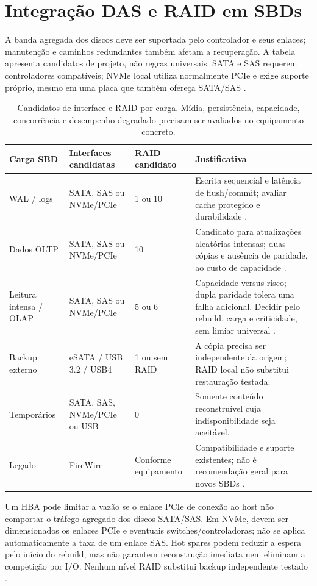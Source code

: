 \documentclass[titlepage]{article}
\begin{document}
\section{Integração DAS e RAID em SBDs}
\label{sec:das_raid_integracao}
A banda agregada dos discos deve ser suportada pelo controlador e seus enlaces; manutenção e caminhos redundantes também afetam a recuperação. A tabela apresenta candidatos de projeto, não regras universais. SATA e SAS requerem controladores compatíveis; NVMe local utiliza normalmente PCIe e exige suporte próprio, mesmo em uma placa que também ofereça SATA/SAS \cite{nvme_overview}.

\begin{table}[htbp]
\centering\footnotesize
\begin{tabularx}{\textwidth}{p{}p{}p{}X}
\toprule
Carga SBD & Interfaces candidatas & RAID candidato & Justificativa \\
\midrule
WAL / logs & SATA, SAS ou NVMe/PCIe & 1 ou 10 & Escrita sequencial e latência de flush/commit; avaliar cache protegido e durabilidade \cite{postgresql_wal_intro,postgresql_wal_config}. \\
Dados OLTP & SATA, SAS ou NVMe/PCIe & 10 & Candidato para atualizações aleatórias intensas; duas cópias e ausência de paridade, ao custo de capacidade \cite{silberschatz2020}. \\
Leitura intensa / OLAP & SATA, SAS ou NVMe/PCIe & 5 ou 6 & Capacidade versus risco; dupla paridade tolera uma falha adicional. Decidir pelo rebuild, carga e criticidade, sem limiar universal \cite{plank2008}. \\
Backup externo & eSATA / USB 3.2 / USB4 & 1 ou sem RAID & A cópia precisa ser independente da origem; RAID local não substitui restauração testada. \\
Temporários & SATA, SAS, NVMe/PCIe ou USB & 0 & Somente conteúdo reconstruível cuja indisponibilidade seja aceitável. \\
Legado & FireWire & Conforme equipamento & Compatibilidade e suporte existentes; não é recomendação geral para novos SBDs \cite{ti_firewire}. \\
\bottomrule
\end{tabularx}
\caption{Candidatos de interface e RAID por carga. Mídia, persistência, capacidade, concorrência e desempenho degradado precisam ser avaliados no equipamento concreto.}
\label{tab:das_raid_recomendacao}
\end{table}

Um HBA pode limitar a vazão se o enlace PCIe de conexão ao host não comportar o tráfego agregado dos discos SATA/SAS. Em NVMe, devem ser dimensionados os enlaces PCIe e eventuais switches/controladoras; não se aplica automaticamente a taxa de um enlace SAS. Hot spares podem reduzir a espera pelo início do rebuild, mas não garantem reconstrução imediata nem eliminam a competição por I/O. Nenhum nível RAID substitui backup independente testado \cite{krioukov2008}.
\end{document}
